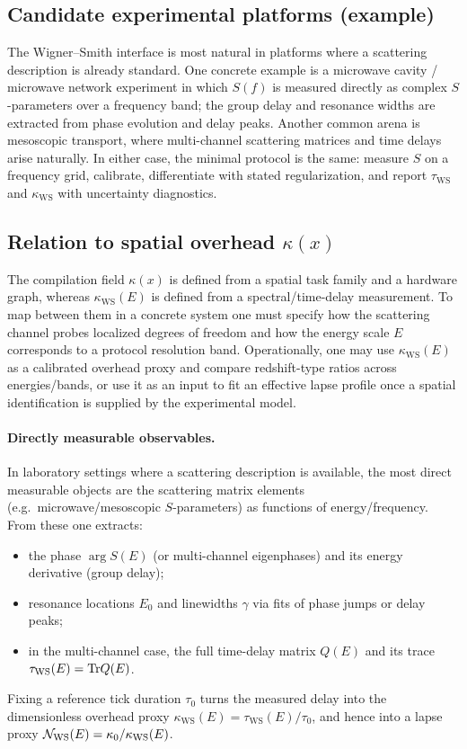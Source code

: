 \subsection{Candidate experimental platforms (example)}
\label{app:wigner_smith_platforms}

The Wigner--Smith interface is most natural in platforms where a scattering description is already standard.
One concrete example is a microwave cavity / microwave network experiment in which $S(f)$ is measured directly as complex $S$-parameters over a frequency band; the group delay and resonance widths are extracted from phase evolution and delay peaks.
Another common arena is mesoscopic transport, where multi-channel scattering matrices and time delays arise naturally.
In either case, the minimal protocol is the same: measure $S$ on a frequency grid, calibrate, differentiate with stated regularization, and report $\tau_{\mathrm{WS}}$ and $\kappa_{\mathrm{WS}}$ with uncertainty diagnostics.

\subsection{Relation to spatial overhead \texorpdfstring{$\kappa(x)$}{kappa(x)}}
\label{app:wigner_smith_relation_kappa_x}

The compilation field $\kappa(x)$ is defined from a spatial task family and a hardware graph, whereas $\kappa_{\mathrm{WS}}(E)$ is defined from a spectral/time-delay measurement.
To map between them in a concrete system one must specify how the scattering channel probes localized degrees of freedom and how the energy scale $E$ corresponds to a protocol resolution band.
Operationally, one may use $\kappa_{\mathrm{WS}}(E)$ as a calibrated overhead proxy and compare redshift-type ratios across energies/bands, or use it as an input to fit an effective lapse profile once a spatial identification is supplied by the experimental model.

\paragraph{Directly measurable observables.}
In laboratory settings where a scattering description is available, the most direct measurable objects are the scattering matrix elements (e.g.\ microwave/mesoscopic $S$-parameters) as functions of energy/frequency.
From these one extracts:
\begin{itemize}
\item the phase $\arg S(E)$ (or multi-channel eigenphases) and its energy derivative (group delay);
\item resonance locations $E_0$ and linewidths $\gamma$ via fits of phase jumps or delay peaks;
\item in the multi-channel case, the full time-delay matrix $Q(E)$ and its trace $\tau_{\mathrm{WS}}(E)=\mathrm{Tr} Q(E)$.
\end{itemize}
Fixing a reference tick duration $\tau_0$ turns the measured delay into the dimensionless overhead proxy $\kappa_{\mathrm{WS}}(E)=\tau_{\mathrm{WS}}(E)/\tau_0$, and hence into a lapse proxy $\mathcal{N}_{\mathrm{WS}}(E)=\kappa_0/\kappa_{\mathrm{WS}}(E)$.



